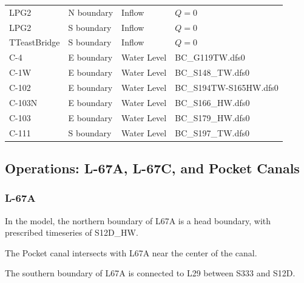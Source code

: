 \begin{table}[!h]
\begin{tabular}{llll}
 LPG2           & N boundary  & Inflow          & $Q=0$ \\
 LPG2           & S boundary  & Inflow          & $Q=0$ \\
 TTeastBridge   & S boundary  & Inflow          & $Q=0$ \\
 C-4            & E boundary  & Water Level     & BC\_G119TW.dfs0 \\
 C-1W           & E boundary  & Water Level     & BC\_S148\_TW.dfs0 \\
 C-102          & E boundary  & Water Level     & BC\_S194TW-S165HW.dfs0 \\
 C-103N         & E boundary  & Water Level     & BC\_S166\_HW.dfs0 \\
 C-103          & E boundary  & Water Level     & BC\_S179\_HW.dfs0 \\
 C-111          & S boundary  & Water Level     & BC\_S197\_TW.dfs0 \\
\hline
\end{tabular}
\end{table}
\normalsize


\clearpage
\subsection{Operations: L-67A, L-67C, and Pocket Canals}

\subsubsection{L-67A}

In the model, the northern boundary of L67A is a head boundary, with prescribed timeseries of S12D\_HW.

The Pocket canal intersects with L67A near the center of the canal.

The southern boundary of L67A is connected to L29 between S333 and S12D.


